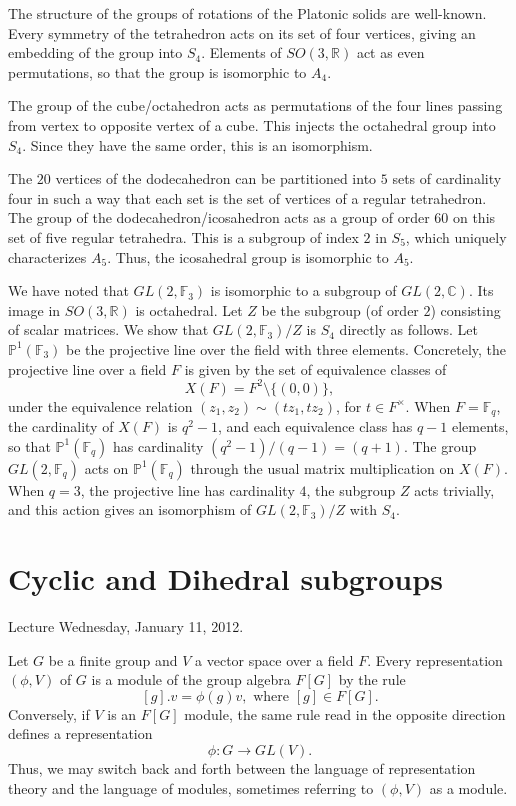 \documentclass{amsart}
\newcommand{\ring}[1]{\mathbb{#1}}
\begin{document}
The structure of the groups of rotations of the Platonic solids are well-known.
Every symmetry of the tetrahedron acts on its set of four vertices, giving
an embedding of the group into $S_4$.  Elements of $SO(3,\ring{R})$ act as
even permutations, so that the group is isomorphic to $A_4$.

The group of the cube/octahedron acts as permutations of the four lines passing
from vertex to opposite vertex of a cube.  This injects the octahedral group
into $S_4$.  Since they have the same order, this is an isomorphism.

The $20$ vertices of the dodecahedron can be partitioned into $5$ sets of cardinality
four in such a way that each set is the set of vertices of a regular tetrahedron.
The group of the dodecahedron/icosahedron acts as a group of order $60$ 
on this set of five
regular tetrahedra.  This is a subgroup of index $2$ in $S_5$, which uniquely
characterizes  $A_5$.  Thus, the icosahedral group is isomorphic to $A_5$.

We have noted that $GL(2,\ring{F}_3)$ is isomorphic to a subgroup of
$GL(2,\ring{C})$.  Its image in $SO(3,\ring{R})$ is octahedral.  Let
$Z$ be the subgroup (of order $2$) consisting of scalar matrices.  We
show that $GL(2,\ring{F}_3)/Z$ is $S_4$ directly as follows.  Let
$\ring{P}^1(\ring{F}_3)$ be the projective line over the field with
three elements.  Concretely, the projective line over a field $F$ is
given by the set of equivalence classes of
\[
X(F)=F^2 \setminus \{(0,0)\},
\]
under the equivalence relation $(z_1,z_2)\sim (t z_1,t z_2)$, for
$t\in F^\times$.  When $F=\ring{F}_q$, the cardinality of $X(F)$ is
$q^2-1$, and each equivalence class has $q-1$ elements, so that
$\ring{P}^1(\ring{F}_q)$ has cardinality $(q^2-1)/(q-1)=(q+1)$.  The
group $GL(2,\ring{F}_q)$ acts on $\ring{P}^1(\ring{F}_q)$ through the
usual matrix multiplication on $X(F)$.  When $q=3$, the projective
line has cardinality $4$, the subgroup $Z$ acts trivially, and this
action gives an isomorphism of $GL(2,\ring{F}_3)/Z$ with $S_4$.


\newpage
\section{Cyclic and Dihedral subgroups}

Lecture Wednesday, January 11, 2012.


Let $G$ be a finite group and $V$ a vector space over a field $F$.  
Every representation $(\phi,V)$ of $G$
is a module of the group algebra $F[G]$ by the rule 
\[
[g].v = \phi(g)v, \text{ where } [g]\in F[G].
\]
Conversely, if $V$ is an $F[G]$ module, the same rule read in the opposite
direction defines a representation
\[
\phi:G\to GL(V).
\]
Thus, we may switch back and forth between the language of representation
theory and the language of modules, sometimes referring to $(\phi,V)$ as
a module.
\end{document}
